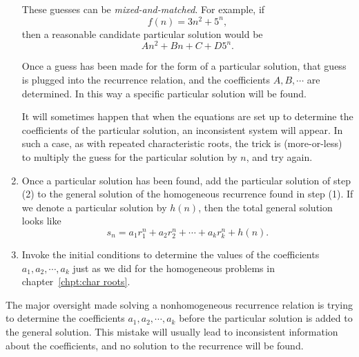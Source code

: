 \begin{enumerate}[label=Step (\arabic*):]
 
 These guesses can be {\itshape mixed-and-matched}. For example, if 
 \[
  f(n)= 3n^2+5^n,
 \] then a reasonable candidate particular solution
 would be 
 \[
  An^2+Bn+C+D5^n. 
 \]
 
 Once a guess has been made for the form of a particular solution, that
 guess is plugged into the recurrence relation, and the coefficients
 $A,B,\cdots$ are determined. In this way a specific particular solution
 will be found.
 
 It will sometimes happen that when the equations are set up to determine
 the coefficients of the particular solution, an inconsistent system
 will appear. In such a case, as with repeated characteristic roots, the
 trick is (more-or-less) to multiply the guess for the particular solution by $n$, and
 try again.
 
 \item Once a particular solution has been found, add the particular 
 solution of step (2) to the general solution of the
 homogeneous recurrence found in step (1).  If we denote a particular
 solution by $h(n)$, then the total general solution looks like
 \[
  s_n=a_1r_1^n+a_2r_2^n+\cdots+a_kr_k^n+h(n).
 \]
 
 \item Invoke the initial conditions to
 determine the values of the coefficients
  $a_1,a_2,\cdots,a_k$
 just as we did for the
 homogeneous problems in chapter~\ref{chpt:char roots}.  
 
\end{enumerate}





The major oversight made solving
a nonhomogeneous recurrence relation is trying to determine the coefficients
 $a_1,a_2,\cdots,a_k$ before
the particular solution is added to the general solution. This mistake
will usually lead to inconsistent information about the coefficients,
and no solution to the recurrence will be found.


